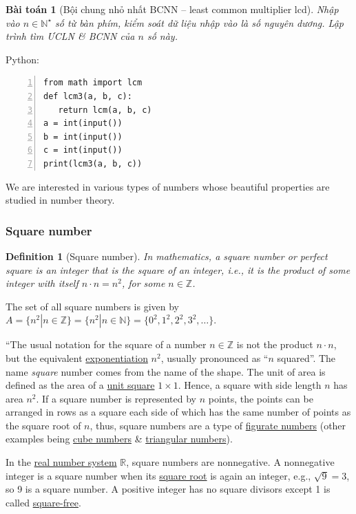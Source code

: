 \documentclass{article}
\newtheorem{baitoan}{Bài toán}
\newtheorem{definition}{Definition}
\begin{document}
\begin{baitoan}[Bội chung nhỏ nhất BCNN -- least common multiplier lcd]
	Nhập vào $n\in\mathbb{N}^\star$ số từ bàn phím, kiểm soát dữ liệu nhập vào là số nguyên dương. Lập trình tìm \emph{ƯCLN} \& \emph{BCNN} của $n$ số này.
\end{baitoan}
Python:
\begin{Verbatim}[numbers=left,xleftmargin=5mm]
from math import lcm
def lcm3(a, b, c):
   return lcm(a, b, c)
a = int(input())
b = int(input())
c = int(input())
print(lcm3(a, b, c))
\end{Verbatim}
We are interested in various types of numbers whose beautiful properties are studied in number theory.

\subsubsection{Square number}

\begin{definition}[Square number]
	In mathematics, a \emph{square number} or \emph{perfect square} is an integer that is the square of an integer, i.e., it is the product of some integer with itself $n\cdot n = n^2$, for some $n\in\mathbb{Z}$. 
\end{definition}
The set of all square numbers is given by $A = \{n^2|n\in\mathbb{Z}\} = \{n^2|n\in\mathbb{N}\} = \{0^2,1^2,2^2,3^2,\ldots\}$.
 
``The usual notation for the square of a number $n\in\mathbb{Z}$ is not the product $n\cdot n$, but the equivalent \href{https://en.wikipedia.org/wiki/Exponentiation}{exponentiation} $n^2$, usually pronounced as ``$n$ squared''. The name \textit{square} number comes from the name of the shape. The unit of area is defined as the area of a \href{https://en.wikipedia.org/wiki/Unit_square}{unit square} $1\times1$. Hence, a square with side length $n$ has area $n^2$. If a square number is represented by $n$ points, the points can be arranged in rows as a square each side of which has the same number of points as the square root of $n$, thus, square numbers are a type of \href{https://en.wikipedia.org/wiki/Figurate_number}{figurate numbers} (other examples being \href{https://en.wikipedia.org/wiki/Cube_(algebra)}{cube numbers} \& \href{https://en.wikipedia.org/wiki/Triangular_numbers}{triangular numbers}).

In the \href{https://en.wikipedia.org/wiki/Real_number}{real number system} $\mathbb{R}$, square numbers are nonnegative. A nonnegative integer is a square number when its \href{https://en.wikipedia.org/wiki/Square_root}{square root} is again an integer, e.g., $\sqrt{9} = 3$, so 9 is a square number. A positive integer has no square divisors except 1 is called \href{https://en.wikipedia.org/wiki/Square-free_integer}{square-free}.
\end{document}
